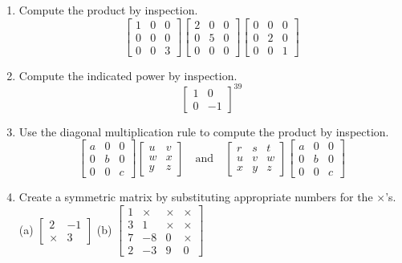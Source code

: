 \documentclass{article}
\theoremstyle{mystyle}
\begin{document}
\begin{enumerate}
    \item[11.] Compute the product by inspection.
    \[
    \begin{bmatrix}1&0&0\\0&0&0\\0&0&3\end{bmatrix}
    \begin{bmatrix}2&0&0\\0&5&0\\0&0&0\end{bmatrix}
    \begin{bmatrix}0&0&0\\0&2&0\\0&0&1\end{bmatrix}
    \]

    \item[13.] Compute the indicated power by inspection.
    \[
    \begin{bmatrix}1&0\\0&-1\end{bmatrix}^{39}
    \]

    \item[15.] Use the diagonal multiplication rule to compute the product by inspection.
    \[
    \begin{bmatrix}a&0&0\\0&b&0\\0&0&c\end{bmatrix}
    \begin{bmatrix}u&v\\w&x\\y&z\end{bmatrix}
    \quad\text{and}\quad
    \begin{bmatrix}r&s&t\\u&v&w\\x&y&z\end{bmatrix}
    \begin{bmatrix}a&0&0\\0&b&0\\0&0&c\end{bmatrix}
    \]

    \item[17.] Create a symmetric matrix by substituting appropriate numbers for the $\times$'s.\\[2pt]
    (a) $\begin{bmatrix}2&-1\\\times&3\end{bmatrix}$\qquad
    (b) $\begin{bmatrix}1&\times&\times&\times\\3&1&\times&\times\\7&-8&0&\times\\2&-3&9&0\end{bmatrix}$


\end{enumerate}
\end{document}
